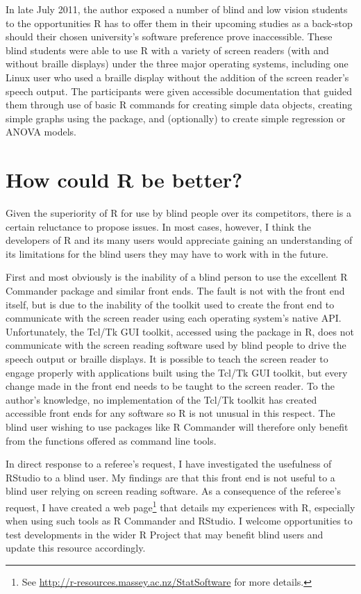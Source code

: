 In late July 2011, the author exposed a number of blind and low vision students to the opportunities R has to offer them in their upcoming studies as a back-stop should their chosen university's software preference prove inaccessible. These blind students were able to use R with a variety of screen readers (with and without braille displays) under the three major operating systems, including one Linux user who used a braille display without the addition of the screen reader's speech output. The participants were given accessible documentation that guided them through use of basic R commands for creating simple data objects, creating simple graphs using the  package, and (optionally) to create simple regression or ANOVA models.




\section{How could R be better?}

Given the superiority of R for use by blind people over its competitors, there is a certain reluctance to propose issues. In most cases, however, I think the developers of R and its many users would appreciate gaining an understanding of its limitations for the blind users they may have to work with in the future.

First and most obviously is the inability of a blind person to use the excellent R Commander package  \citep{Rcmdr} and similar front ends. The fault is not with the front end itself, but is due to the inability of the toolkit used to create the front end to communicate with the screen reader using each operating system's native API. Unfortunately, the Tcl/Tk GUI toolkit, accessed using the  package in R, 
does not communicate with the screen reading software used by blind people to drive the speech output or braille displays. It is possible to teach the screen reader to engage properly with applications built using the Tcl/Tk GUI toolkit, but every change made in the front end needs to be taught to the screen reader. 
To the author's knowledge, no implementation of the Tcl/Tk toolkit has created accessible front ends for any software so R is not unusual in this respect. The blind user wishing to use packages like R Commander will therefore only benefit from the functions offered as command line tools. 

In direct response to a referee's request, I have investigated the usefulness of RStudio \citep{RStudio} to a blind user. My findings are that this front end is not useful to a blind user relying on screen reading software. As a consequence of the referee's request, I have created a web page\footnote{See \url{http://r-resources.massey.ac.nz/StatSoftware} for more details.}  that details my experiences with R, especially when using such tools as R Commander and RStudio. I welcome opportunities to test developments in the wider R Project that may benefit blind users and update this resource accordingly.


